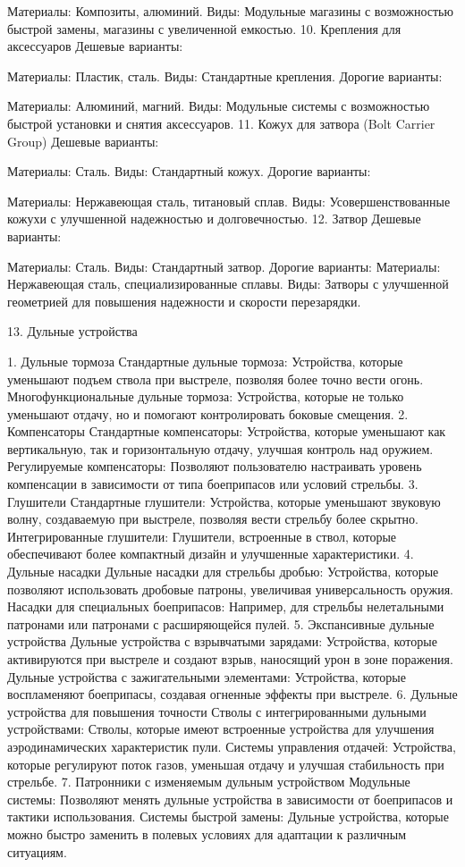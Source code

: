 \documentclass[a4paper,12pt]{article}
\begin{document}
Материалы: Композиты, алюминий.
Виды: Модульные магазины с возможностью быстрой замены, магазины с увеличенной емкостью.
10. Крепления для аксессуаров
Дешевые варианты:

Материалы: Пластик, сталь.
Виды: Стандартные крепления.
Дорогие варианты:

Материалы: Алюминий, магний.
Виды: Модульные системы с возможностью быстрой установки и снятия аксессуаров.
11. Кожух для затвора (Bolt Carrier Group)
Дешевые варианты:

Материалы: Сталь.
Виды: Стандартный кожух.
Дорогие варианты:

Материалы: Нержавеющая сталь, титановый сплав.
Виды: Усовершенствованные кожухи с улучшенной надежностью и долговечностью.
12. Затвор
Дешевые варианты:

Материалы: Сталь.
Виды: Стандартный затвор.
Дорогие варианты:
Материалы: Нержавеющая сталь, специализированные сплавы.
Виды: Затворы с улучшенной геометрией для повышения надежности и скорости перезарядки.

13. Дульные устройства

1. Дульные тормоза
Стандартные дульные тормоза: Устройства, которые уменьшают подъем ствола при выстреле, позволяя более точно вести огонь.
Многофункциональные дульные тормоза: Устройства, которые не только уменьшают отдачу, но и помогают контролировать боковые смещения.
2. Компенсаторы
Стандартные компенсаторы: Устройства, которые уменьшают как вертикальную, так и горизонтальную отдачу, улучшая контроль над оружием.
Регулируемые компенсаторы: Позволяют пользователю настраивать уровень компенсации в зависимости от типа боеприпасов или условий стрельбы.
3. Глушители
Стандартные глушители: Устройства, которые уменьшают звуковую волну, создаваемую при выстреле, позволяя вести стрельбу более скрытно.
Интегрированные глушители: Глушители, встроенные в ствол, которые обеспечивают более компактный дизайн и улучшенные характеристики.
4. Дульные насадки
Дульные насадки для стрельбы дробью: Устройства, которые позволяют использовать дробовые патроны, увеличивая универсальность оружия.
Насадки для специальных боеприпасов: Например, для стрельбы нелетальными патронами или патронами с расширяющейся пулей.
5. Экспансивные дульные устройства
Дульные устройства с взрывчатыми зарядами: Устройства, которые активируются при выстреле и создают взрыв, наносящий урон в зоне поражения.
Дульные устройства с зажигательными элементами: Устройства, которые воспламеняют боеприпасы, создавая огненные эффекты при выстреле.
6. Дульные устройства для повышения точности
Стволы с интегрированными дульными устройствами: Стволы, которые имеют встроенные устройства для улучшения аэродинамических характеристик пули.
Системы управления отдачей: Устройства, которые регулируют поток газов, уменьшая отдачу и улучшая стабильность при стрельбе.
7. Патронники с изменяемым дульным устройством
Модульные системы: Позволяют менять дульные устройства в зависимости от боеприпасов и тактики использования.
Системы быстрой замены: Дульные устройства, которые можно быстро заменить в полевых условиях для адаптации к различным ситуациям.
\end{document}
